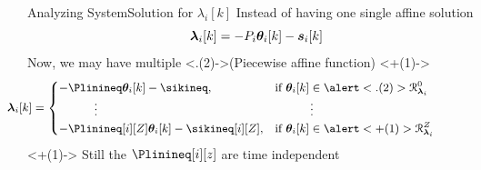 \documentclass[handout,aspectratio=169]{beamer}
\begin{document}
\begin{frame}{Analyzing System}{Solution for $\lambda_{i}[k]$}
  \centering
  Instead of having one single affine solution
  \begin{equation*}
    \lambdaik=-\Plin\thetaik-\sik
  \end{equation*}
  \pause
  Now, we may have multiple \onslide<.(2)->{(Piecewise affine function)}
  \onslide<+(1)->{
    \begin{equation*}
      \small
      \hspace{-2cm}
      \begin{aligned}
        \lambdaik=
        \begin{cases}
          {-\Plinineq\thetaik-\sikineq},&\text{if}\ \thetaik \in\alert<.(2)>{\set{R}_{\lambdai}^{0}}\tikzmark{a}\\
          \qquad\quad \vdots&\qquad\quad \vdots\\
          -\Plinineq[i][Z]\thetaik-\sikineq[i][Z],&\text{if}\ \thetaik \in\alert<+(1)>{\set{R}_{\lambdai}^{Z}}\\
        \end{cases}
      \end{aligned}
    \end{equation*}
  }
  \onslide<+(1)->{
    \alert<+>{Still the $\Plinineq[i][z]$ are time independent}
  }
\end{frame}
\end{document}
